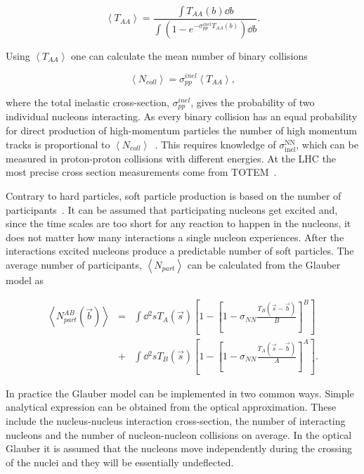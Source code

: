 \begin{equation}
\left<T_{AA}\right>=\frac{\int T_{AA}\left(b\right) \dd b}
{\int\left(1-e^{-\sigma^{inel}_{pp}T_{AA}\left(b\right)}\right)\dd b}.
\end{equation}

\noindent Using $\left<T_{AA}\right>$ one can calculate the mean number of binary collisions

\begin{equation}
\left<N_{coll}\right>=\sigma_{pp}^{inel}\left<T_{AA}\right>,
\end{equation}

\noindent where the total inelastic cross-section, $\sigma_{pp}^{inel}$, gives the probability of two individual nucleons interacting. As every binary collision has an equal probability for direct production of high-momentum particles the number of high momentum tracks is proportional to $\left<N_{coll}\right>$~\cite{Abelev:2013qoq,Kharzeev:2004if,Deng:2010mv}. This requires knowledge of $\sigma\mathrm{^{NN}_{inel}}$, which can be measured in proton-proton collisions with different energies. At the LHC the most precise cross section measurements come from TOTEM~\cite{Antchev:2017dia}.

Contrary to hard particles, soft particle production is based on the number of participants~\cite{Kharzeev:2004if}. It can be assumed that participating nucleons get excited and, since the time scales are too short for any reaction to happen in the nucleons, it does not matter how many interactions a single nucleon experiences. After the interactions excited nucleons produce a predictable number of soft particles. The average number of participants, $\left<N_{part}\right>$ can be calculated from the Glauber model  as


\begin{eqnarray}
\left<N_{part}^{AB}\left(\vec b\right)\right>&=&\int \dd{^2s} T_A\left(\vec s\right)\left[1-\left[1-\sigma_{NN}\frac{T_B\left(\vec s - \vec b\right)}{B}\right]^B\right] \nonumber \\
 &+ &\int \dd{^2 s} T_B\left(\vec s\right)\left[1-\left[1-\sigma_{NN}\frac{T_A\left(\vec s - \vec b\right)}{A}\right]^A\right].
\end{eqnarray}



In practice the Glauber model can be implemented in two common ways. Simple analytical expression can be obtained from the optical approximation. These include the nucleus-nucleus interaction cross-section, the number of interacting  nucleons and the number of nucleon-nucleon collisions on average. In the optical Glauber it is assumed that  the nucleons move independently during the crossing of the nuclei and they will be essentially undeflected.  

